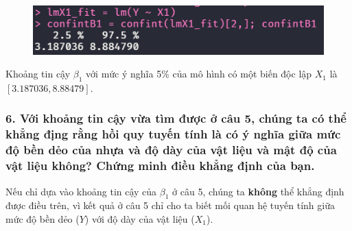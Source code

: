 \documentclass[a4paper]{article}
\theoremstyle{nonumberplain}
\begin{document}
\begin{figure}[h]
	\centering
	\includegraphics[width=0.7\linewidth]{bai-2-5-confint-beta1}
	\label{fig:bai-2-5-confint-beta1}
\end{figure}

Khoảng tin cậy $\beta_1$ với mức ý nghĩa 5\% của mô hình có một biến độc lập $X_1$ là $[3.187036,8.88479]$.

\subsubsection*{6. Với khoảng tin cậy vừa tìm được ở câu 5, chúng ta có thể khẳng địng rằng hồi quy tuyến tính là có ý nghĩa giữa mức độ bền dẻo của nhựa và độ dày của vật liệu và mật độ của vật liệu không? Chứng minh điều khẳng định của bạn.}

Nếu chỉ dựa vào khoảng tin cậy của $\beta_1$ ở câu 5, chúng ta \textbf{không} thể khẳng định được điều trên, vì kết quả ở câu 5 chỉ cho ta biết mối quan hệ tuyến tính giữa mức độ bền dẻo ($Y$) với độ dày của vật liệu ($X_1$).
\end{document}
